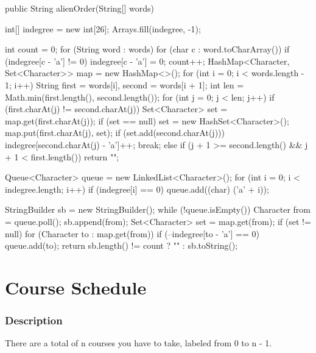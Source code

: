 \begin{Code}
public String alienOrder(String[] words) {
    int[] indegree = new int[26];
    Arrays.fill(indegree, -1);

    int count = 0;
    for (String word : words) {
        for (char c : word.toCharArray()) {
            if (indegree[c - 'a'] != 0) {
                indegree[c - 'a'] = 0;
                count++;
            }
        }
    }
    HashMap<Character, Set<Character>> map = new HashMap<>();
    for (int i = 0; i < words.length - 1; i++) {
        String first = words[i], second = words[i + 1];
        int len = Math.min(first.length(), second.length());
        for (int j = 0; j < len; j++) {
            if (first.charAt(j) != second.charAt(j)) {
                Set<Character> set = map.get(first.charAt(j));
                if (set == null) {
                    set = new HashSet<Character>();
                    map.put(first.charAt(j), set);
                }
                if (set.add(second.charAt(j))) {
                    indegree[second.charAt(j) - 'a']++;
                }
                break;
            } else {
                if (j + 1 >= second.length() && j + 1 < first.length()) { return ""; }
            }
        }
    }

    Queue<Character> queue = new LinkedList<Character>();
    for (int i = 0; i < indegree.length; i++) {
        if (indegree[i] == 0) {
            queue.add((char) ('a' + i));
        }
    }

    StringBuilder sb = new StringBuilder();
    while (!queue.isEmpty()) {
        Character from = queue.poll();
        sb.append(from);
        Set<Character> set = map.get(from);
        if (set != null) {
            for (Character to : map.get(from)) {
                if (--indegree[to - 'a'] == 0) {
                    queue.add(to);
                }
            }
        }
    }
    return sb.length() != count ? "" : sb.toString();
}
\end{Code}

\newpage

\section{Course Schedule} %

\subsubsection{Description}
There are a total of n courses you have to take, labeled from 0 to n - 1.

